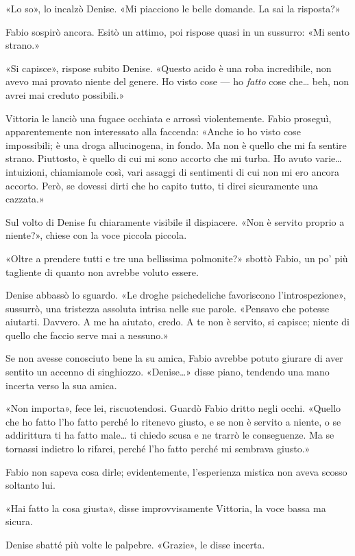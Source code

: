 «Lo so», lo incalzò Denise. «Mi piacciono le belle domande. La sai la risposta?»

Fabio sospirò ancora. Esitò un attimo, poi rispose quasi in un sussurro: «Mi sento strano.»

«Si capisce», rispose subito Denise. «Questo acido è una roba incredibile, non avevo mai provato niente del genere. Ho visto cose --- ho \emph{fatto} cose che\ldots{} beh, non avrei mai creduto possibili.»

Vittoria le lanciò una fugace occhiata e arrossì violentemente. Fabio proseguì, apparentemente non interessato alla faccenda: «Anche io ho visto cose impossibili; è una droga allucinogena, in fondo. Ma non è quello che mi fa sentire strano. Piuttosto, è quello di cui mi sono accorto che mi turba. Ho avuto varie\ldots{} intuizioni, chiamiamole così, vari assaggi di sentimenti di cui non mi ero ancora accorto. Però, se dovessi dirti che ho capito tutto, ti direi sicuramente una cazzata.»

Sul volto di Denise fu chiaramente visibile il dispiacere. «Non è servito proprio a niente?», chiese con la voce piccola piccola. 

«Oltre a prendere tutti e tre una bellissima polmonite?» sbottò Fabio, un po' più tagliente di quanto non avrebbe voluto essere.

Denise abbassò lo sguardo. «Le droghe psichedeliche favoriscono l'introspezione», sussurrò, una tristezza assoluta intrisa nelle sue parole. «Pensavo che potesse aiutarti. Davvero. A me ha aiutato, credo. A te non è servito, si capisce; niente di quello che faccio serve mai a nessuno.»

Se non avesse conosciuto bene la su amica, Fabio avrebbe potuto giurare di aver sentito un accenno di singhiozzo. «Denise\ldots{}» disse piano, tendendo una mano incerta verso la sua amica.

«Non importa», fece lei, riscuotendosi. Guardò Fabio dritto negli occhi. «Quello che ho fatto l'ho fatto perché lo ritenevo giusto, e se non è servito a niente, o se addirittura ti ha fatto male\ldots{} ti chiedo scusa e ne trarrò le conseguenze. Ma se tornassi indietro lo rifarei, perché l'ho fatto perché mi sembrava giusto.»

Fabio non sapeva cosa dirle; evidentemente, l'esperienza mistica non aveva scosso soltanto lui.

«Hai fatto la cosa giusta», disse improvvisamente Vittoria, la voce bassa ma sicura.

Denise sbatté più volte le palpebre. «Grazie», le disse incerta. 

